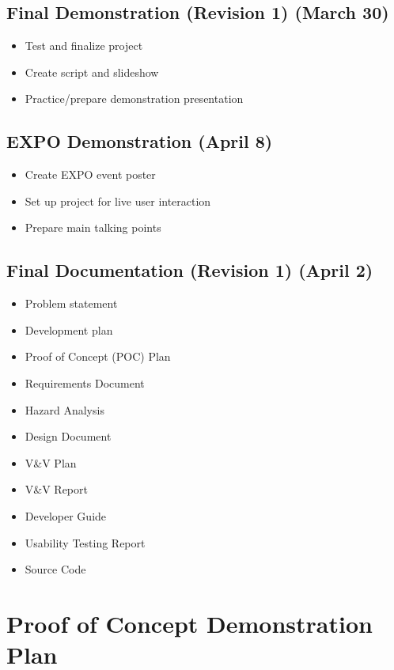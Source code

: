 \documentclass{article}
\begin{document}
	\subsection*{Final Demonstration (Revision 1) (March 30)}
	\begin{itemize}
		\item Test and finalize project
		\item Create script and slideshow
		\item Practice/prepare demonstration presentation
	\end{itemize}

	\subsection*{EXPO Demonstration (April 8)}
	\begin{itemize}
		\item Create EXPO event poster
		\item Set up project for live user interaction
		\item Prepare main talking points
	\end{itemize}

	\subsection*{Final Documentation (Revision 1) (April 2)}
	\begin{itemize}
		\item Problem statement
		\item Development plan
		\item Proof of Concept (POC) Plan
		\item Requirements Document
		\item Hazard Analysis
		\item Design Document
		\item V\&V Plan
		\item V\&V Report
		\item Developer Guide
		\item Usability Testing Report
		\item Source Code
	\end{itemize}

\section{Proof of Concept Demonstration Plan}
\end{document}
